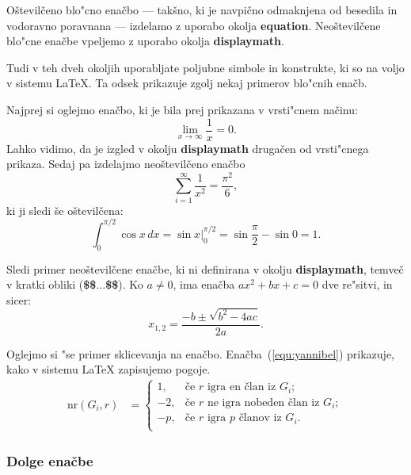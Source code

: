 \documentclass[sigconf,nonacm]{acmart}
\begin{document}
Oštevilčeno blo"cno enačbo --- takšno, ki je navpično odmaknjena od besedila
in vodoravno poravnana --- izdelamo z uporabo okolja \textbf{equation}.
Neoštevilčene blo"cne enačbe vpeljemo z uporabo okolja \textbf{displaymath}.

Tudi v teh dveh okoljih uporabljate poljubne simbole in konstrukte, ki so na
voljo v sistemu \LaTeX. Ta odsek prikazuje zgolj nekaj primerov blo"cnih
enačb.

Najprej si oglejmo enačbo, ki je bila prej prikazana v vrsti"cnem načinu: 
%
\begin{equation}
\lim_{x\rightarrow \infty}\frac{1}{x}=0.
\end{equation}
%
Lahko vidimo, da je izgled v okolju \textbf{displaymath} drugačen od vrsti"cnega
prikaza.  Sedaj pa izdelajmo neoštevilčeno enačbo
%
\begin{displaymath}
    \sum_{i=1}^{\infty} \frac{1}{x^2} = \frac{\pi^2}{6},
\end{displaymath}
%
ki ji sledi še oštevilčena:
%
\begin{equation}
    \int_{0}^{\pi/2} \cos x\,dx = \sin x\bigg\rvert_{0}^{\pi/2} = \sin
    \frac{\pi}{2} - \sin 0 = 1.
\end{equation}

Sledi primer neoštevilčene enačbe, ki ni definirana v okolju
\textbf{displaymath}, temveč v kratki obliki (\textbf{\$\$$\ldots$\$\$}).  Ko $a
\ne 0$, ima enačba $ax^2 + bx + c = 0$ dve re"sitvi, in sicer:
%
$$x_{1, 2} = \frac{-b \pm \sqrt{b^2-4ac}}{2a}.$$

Oglejmo si "se primer sklicevanja na enačbo. Enačba~(\ref{equ:yannibel})
prikazuje, kako v sistemu \LaTeX{} zapisujemo pogoje.
%
\begin{equation}
    \begin{aligned} 
        \mathrm{nr}(G_i,r) & = \label{equ:yannibel}
        \begin{cases}
            1,  & \text{če $r$ igra en član iz $G_i$};\\
            -2, & \text{če $r$ ne igra nobeden član iz $G_i$}; \\
            -p, & \text{če $r$ igra $p$ članov iz $G_i$}.\\
        \end{cases}
    \end{aligned}
\end{equation}

\subsubsection{Dolge enačbe}
\end{document}
